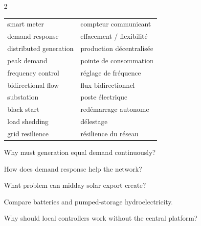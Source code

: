 \begin{multicols}{2}
\begin{tcolorbox}[title=\sffamily\bfseries Daily balancing example,colback=white,colframe=ECPurple]
\begin{center}
\end{center}
\end{tcolorbox}

\begin{vocabulary}
\begin{tabularx}{\linewidth}{@{}lX@{}}
smart meter & compteur communicant\\
demand response & effacement / flexibilité\\
distributed generation & production décentralisée\\
peak demand & pointe de consommation\\
frequency control & réglage de fréquence\\
bidirectional flow & flux bidirectionnel\\
substation & poste électrique\\
black start & redémarrage autonome\\
load shedding & délestage\\
grid resilience & résilience du réseau
\end{tabularx}
\end{vocabulary}

\begin{questions}
\item Why must generation equal demand continuously?
\item How does demand response help the network?
\item What problem can midday solar export create?
\item Compare batteries and pumped-storage hydroelectricity.
\item Why should local controllers work without the central platform?
\end{questions}


\end{multicols}
